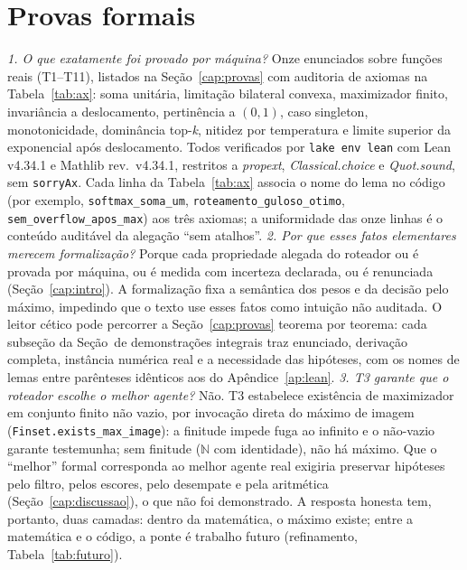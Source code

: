 \section{Provas formais}
\textit{1. O que exatamente foi provado por máquina?} Onze enunciados sobre funções reais (T1--T11), listados na Seção~\ref{cap:provas} com auditoria de axiomas na Tabela~\ref{tab:ax}: soma unitária, limitação bilateral convexa, maximizador finito, invariância a deslocamento, pertinência a $(0,1)$, caso singleton, monotonicidade, dominância top-\textit{k}, nitidez por temperatura e limite superior da exponencial após deslocamento. Todos verificados por \texttt{lake env lean} com Lean v4.34.1 e Mathlib rev.\ v4.34.1, restritos a \textit{propext}, \textit{Classical.choice} e \textit{Quot.sound}, sem \texttt{sorryAx}. Cada linha da Tabela~\ref{tab:ax} associa o nome do lema no código (por exemplo, \texttt{softmax\_soma\_um}, \nolinkurl{roteamento_guloso_otimo}, \texttt{sem\_overflow\_apos\_max}) aos três axiomas; a uniformidade das onze linhas é o conteúdo auditável da alegação ``sem atalhos''.
\textit{2. Por que esses fatos elementares merecem formalização?} Porque cada propriedade alegada do roteador ou é provada por máquina, ou é medida com incerteza declarada, ou é renunciada (Seção~\ref{cap:intro}). A formalização fixa a semântica dos pesos e da decisão pelo máximo, impedindo que o texto use esses fatos como intuição não auditada. O leitor cético pode percorrer a Seção~\ref{cap:provas} teorema por teorema: cada subseção da Seção~de demonstrações integrais traz enunciado, derivação completa, instância numérica real e a necessidade das hipóteses, com os nomes de lemas entre parênteses idênticos aos do Apêndice~\ref{ap:lean}.
\textit{3. T3 garante que o roteador escolhe o melhor agente?} Não. T3 estabelece existência de maximizador em conjunto finito não vazio, por invocação direta do máximo de imagem (\nolinkurl{Finset.exists_max_image}): a finitude impede fuga ao infinito e o não-vazio garante testemunha; sem finitude ($\mathbb{N}$ com identidade), não há máximo. Que o ``melhor'' formal corresponda ao melhor agente real exigiria preservar hipóteses pelo filtro, pelos escores, pelo desempate e pela aritmética (Seção~\ref{cap:discussao}), o que não foi demonstrado. A resposta honesta tem, portanto, duas camadas: dentro da matemática, o máximo existe; entre a matemática e o código, a ponte é trabalho futuro (refinamento, Tabela~\ref{tab:futuro}).
